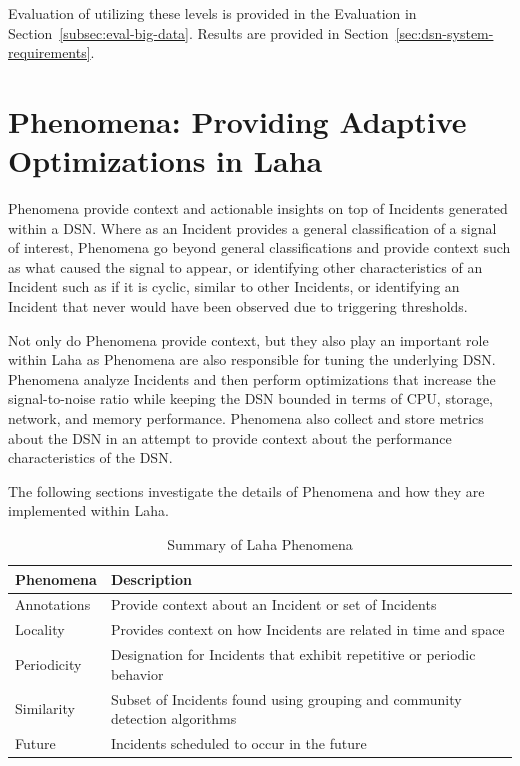 Evaluation of utilizing these levels is provided in the Evaluation in Section~\ref{subsec:eval-big-data}. Results are provided in Section~\ref{sec:dsn-system-requirements}.

\section{Phenomena: Providing Adaptive Optimizations in Laha}\label{sec:phenomena}

Phenomena provide context and actionable insights on top of Incidents generated within a DSN. Where as an Incident provides a general classification of a signal of interest, Phenomena go beyond general classifications and provide context such as what caused the signal to appear, or identifying other characteristics of an Incident such as if it is cyclic, similar to other Incidents, or identifying an Incident that never would have been observed due to triggering thresholds.

Not only do Phenomena provide context, but they also play an important role within Laha as Phenomena are also responsible for tuning the underlying DSN\@. Phenomena analyze Incidents and then perform optimizations that increase the signal-to-noise ratio while keeping the DSN bounded in terms of CPU, storage, network, and memory performance. Phenomena also collect and store metrics about the DSN in an attempt to provide context about the performance characteristics of the DSN\@.

The following sections investigate the details of Phenomena and how they are implemented within Laha.

\begin{table}[h]
	\centering
	\begin{tabularx}{\textwidth}{lX}
		\toprule
		\textbf{Phenomena} & \textbf{Description} \\
		\midrule
		Annotations & Provide context about an Incident or set of Incidents \\
		Locality & Provides context on how Incidents are related in time and space \\
		Periodicity & Designation for Incidents that exhibit repetitive or periodic behavior \\
		Similarity & Subset of Incidents found using grouping and community detection algorithms \\
		Future & Incidents scheduled to occur in the future\\
		\bottomrule
	\end{tabularx}
	\caption{Summary of Laha Phenomena}
	\label{phenomena-summary-table}
\end{table}

